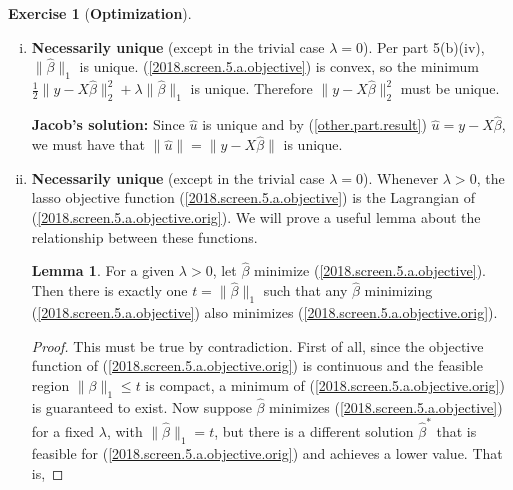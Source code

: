 \documentclass{article}
\theoremstyle{definition}
\newtheorem{exercise}{Exercise}
\theoremstyle{definition}
\theoremstyle{definition}
\newtheorem{lemma}[theorem]{Lemma}
\theoremstyle{definition}
\theoremstyle{definition}
\begin{document}
\begin{exercise}[\textbf{Optimization}]
\begin{enumerate}[(a)]
\begin{enumerate}[(i)]

\item \textbf{Necessarily unique} (except in the trivial case \(\lambda=0\)). Per part 5(b)(iv), \(\lVert \hat{\beta} \rVert_1\) is unique. (\ref{2018.screen.5.a.objective}) is convex, so the minimum \(\frac{1}{2} \lVert y - X \hat{\beta} \rVert_2^2 + \lambda \lVert \hat{\beta} \rVert_1\) is unique. Therefore \( \lVert y - X \hat{\beta} \rVert_2^2\) must be unique.

\textbf{Jacob's solution:} Since \(\hat{u}\) is unique and by (\ref{other.part.result}) \(\hat{u} = y - X \hat{\beta}\), we must have that \(\lVert \hat{u} \rVert = \lVert y - X \hat{\beta} \rVert\) is unique.


\item \textbf{Necessarily unique} (except in the trivial case \(\lambda=0\)). Whenever \(\lambda > 0\), the lasso objective function (\ref{2018.screen.5.a.objective}) is the Lagrangian of (\ref{2018.screen.5.a.objective.orig}). We will prove a useful lemma about the relationship between these functions.

\begin{lemma}\label{2018.screen.5.b.iv.relation}
For a given \(\lambda >0\), let \(\hat{\beta}\) minimize (\ref{2018.screen.5.a.objective}). Then there is exactly one \(t = \lVert \hat{\beta} \rVert_1\) such that any \(\hat{\beta}\) minimizing (\ref{2018.screen.5.a.objective}) also minimizes (\ref{2018.screen.5.a.objective.orig}).

\end{lemma}

\begin{proof}
This must be true by contradiction. First of all, since the objective function of (\ref{2018.screen.5.a.objective.orig}) is continuous and the feasible region \(\lVert \beta \rVert_1 \leq t\) is compact, a minimum of (\ref{2018.screen.5.a.objective.orig}) is guaranteed to exist. Now suppose \(\hat{\beta}\) minimizes (\ref{2018.screen.5.a.objective}) for a fixed \(\lambda\), with \(\lVert \hat{\beta} \rVert_1 = t\), but there is a different solution \(\hat{\beta}^*\) that is feasible for (\ref{2018.screen.5.a.objective.orig}) and achieves a lower value. That is,


\end{proof}
\end{enumerate}
\end{enumerate}
\end{exercise}
\end{document}
